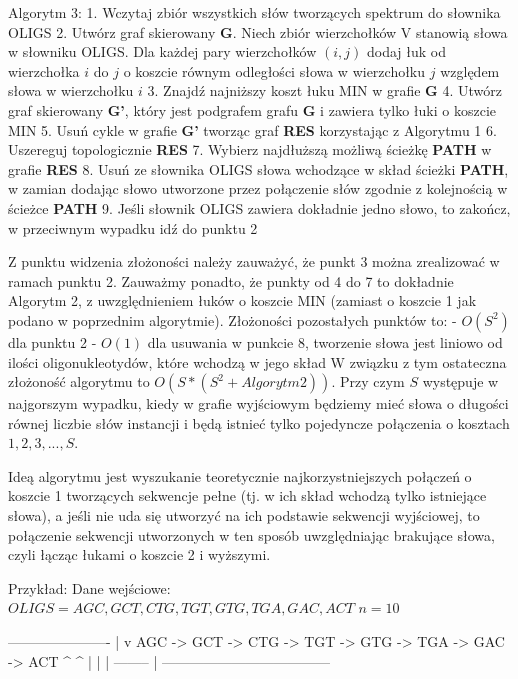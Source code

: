 \documentclass[a4paper]{article}
\begin{document}
Algorytm 3:
1. Wczytaj zbiór wszystkich słów tworzących spektrum do słownika OLIGS
2. Utwórz graf skierowany {\bf G}. Niech zbiór wierzchołków V stanowią słowa w słowniku OLIGS. Dla każdej pary wierzchołków $(i,j)$ dodaj łuk od wierzchołka $i$ do $j$ o koszcie równym odległości słowa w wierzchołku $j$ względem słowa w wierzchołku $i$
3. Znajdź najniższy koszt łuku MIN w grafie {\bf G}
4. Utwórz graf skierowany {\bf G'}, który jest podgrafem grafu {\bf G} i zawiera tylko łuki o koszcie MIN
5. Usuń cykle w grafie {\bf G'} tworząc graf {\bf RES} korzystając z Algorytmu 1
6. Uszereguj topologicznie {\bf RES}
7. Wybierz najdłuższą możliwą ścieżkę {\bf PATH} w grafie {\bf RES}
8. Usuń ze słownika OLIGS słowa wchodzące w skład ścieżki {\bf PATH}, w zamian dodając słowo utworzone przez połączenie słów zgodnie z kolejnością w ścieżce {\bf PATH}
9. Jeśli słownik OLIGS zawiera dokładnie jedno słowo, to zakończ, w przeciwnym wypadku idź do punktu 2

Z punktu widzenia złożoności należy zauważyć, że punkt 3 można zrealizować w ramach punktu 2. Zauważmy ponadto, że punkty od 4 do 7 to dokładnie Algorytm 2, z uwzględnieniem łuków o koszcie MIN (zamiast o koszcie 1 jak podano w poprzednim algorytmie). Złożoności pozostałych punktów to:
- $O(S^2)$ dla punktu 2
- $O(1)$ dla usuwania w punkcie 8, tworzenie słowa jest liniowo od ilości oligonukleotydów, które wchodzą w jego skład
W związku z tym ostateczna złożoność algorytmu to $O(S * (S^2 + Algorytm2))$. Przy czym $S$ występuje w najgorszym wypadku, kiedy w grafie wyjściowym będziemy mieć słowa o długości równej liczbie słów instancji i będą istnieć tylko pojedyncze połączenia o kosztach $1, 2, 3, ..., S$.

Ideą algorytmu jest wyszukanie teoretycznie najkorzystniejszych połączeń o koszcie 1 tworzących sekwencje pełne (tj. w ich skład wchodzą tylko istniejące słowa), a jeśli nie uda się utworzyć na ich podstawie sekwencji wyjściowej, to połączenie sekwencji utworzonych w ten sposób uwzględniając brakujące słowa, czyli łącząc łukami o koszcie 2 i wyższymi. 

Przykład:
Dane wejściowe:
$OLIGS = { AGC, GCT, CTG, TGT, GTG, TGA, GAC, ACT }$
$n = 10$

               ----------------------
               |                    v
AGC -> GCT -> CTG -> TGT -> GTG -> TGA -> GAC -> ACT
               ^      ^      |                    |
               |      --------                    |
               ------------------------------------
\end{document}
